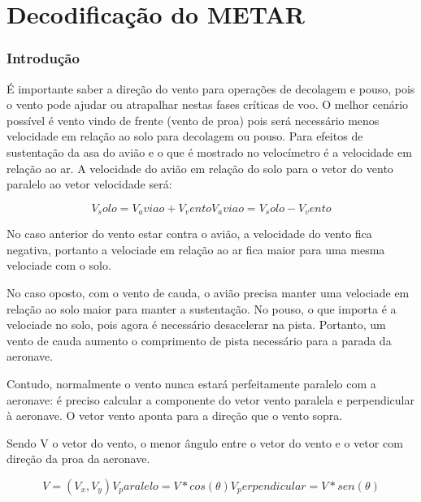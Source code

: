 \chapter{Decodificação do METAR}
\subsection{Introdução}
É importante saber a direção do vento para operações de decolagem e pouso,
pois o vento pode ajudar ou atrapalhar nestas fases críticas de voo.
O melhor cenário possível é vento vindo de frente (vento de proa) pois
será necessário menos velocidade em relação ao solo para decolagem ou 
pouso. Para efeitos de sustentação da asa do avião e o que é mostrado
no velocímetro é a velocidade em relação ao ar. A velocidade do avião 
em relação do solo para o vetor do vento paralelo ao vetor velocidade será:

\begin{equation}
    V_solo = V_aviao + V_vento
    V_aviao = V_solo - V_vento
\end{equation}

No caso anterior do vento estar contra o avião, a velocidade do vento
fica negativa, portanto a velociade em relação ao ar fica maior para
uma mesma velociade com o solo.

No caso oposto, com o vento de cauda, o avião precisa manter uma
velociade em relação ao solo maior para manter a sustentação. No
pouso, o que importa é a velociade
no solo, pois agora é necessário desacelerar na pista. Portanto,
um vento de cauda aumento o comprimento de pista necessário para a 
parada da aeronave.

Contudo, normalmente o vento nunca estará perfeitamente paralelo
com a aeronave: é preciso calcular a componente do vetor vento paralela 
e perpendicular à aeronave. O vetor vento aponta para a direção que o vento sopra.

Sendo V o vetor do vento, \theta o menor ângulo entre o vetor 
do vento e o vetor com direção da proa da aeronave.


\begin{equation}
V = (V_x, V_y)
V_paralelo = V * cos(\theta)
V_perpendicular = V * sen(\theta)
\end{equation}

